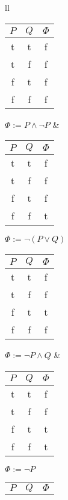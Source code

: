 \documentclass[leqno]{article}
\begin{document}
\begin{enumerate}
  \begin{table}
  \begin{tabular}{ll}
      \begin{tabular}{|cc|c|}
        \hline
        $P$ & $Q$ & $\Phi$ \\
        \hline
         t  &  t  &    f   \\
         t  &  f  &    f   \\
         f  &  t  &    f   \\
         f  &  f  &    f   \\
        \hline
      \end{tabular}
      \quad $\Phi := P \land \neg P$
      &
      \begin{tabular}{|cc|c|}
        \hline
        $P$ & $Q$ & $\Phi$ \\
        \hline
         t  &  t  &    f   \\
         t  &  f  &    f   \\
         f  &  t  &    f   \\
         f  &  f  &    t   \\
        \hline
      \end{tabular}
      \quad $\Phi := \neg (P \lor Q)$
      \\
      \begin{tabular}{|cc|c|}
        \hline
        $P$ & $Q$ & $\Phi$ \\
        \hline
         t  &  t  &    f   \\
         t  &  f  &    f   \\
         f  &  t  &    t   \\
         f  &  f  &    f   \\
        \hline
      \end{tabular}
      \quad $\Phi := \neg P \land Q$
      &
      \begin{tabular}{|cc|c|}
        \hline
        $P$ & $Q$ & $\Phi$ \\
        \hline
         t  &  t  &    f   \\
         t  &  f  &    f   \\
         f  &  t  &    t   \\
         f  &  f  &    t   \\
        \hline
      \end{tabular}
      \quad $\Phi := \neg P$
      \\
      \begin{tabular}{|cc|c|}
        \hline
        $P$ & $Q$ & $\Phi$ \\

\end{tabular}
\end{tabular}
\end{table}
\end{enumerate}
\end{document}
